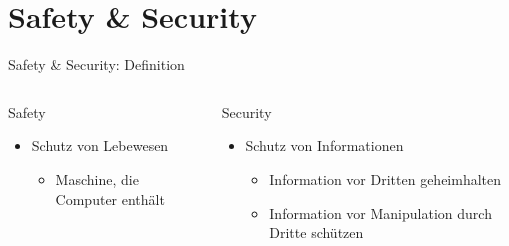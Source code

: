 \section{Safety \& Security}

\begin{frame}[T]{Safety \& Security: Definition}
\small
  \begin{columns}[t,fullwidth]
   \hfill
    \begin{column}{.45\linewidth}
      \begin{block}{Safety}
      \begin{itemize}
        \item Schutz von Lebewesen
      \begin{itemize}
         \item Maschine, die Computer enthält
      \end{itemize}
      \end{itemize}
      \end{block}
    \end{column}
    \hfill
    \begin{column}{.45\linewidth}
      \begin{block}{Security}
      \begin{itemize}
        \item Schutz von Informationen
        \begin{itemize}
          \item Information vor Dritten geheimhalten
          \item Information vor Manipulation durch Dritte schützen
        \end{itemize}
      \end{itemize}
      \end{block}
    \end{column}
    \hfill
  \end{columns}
\end{frame}

